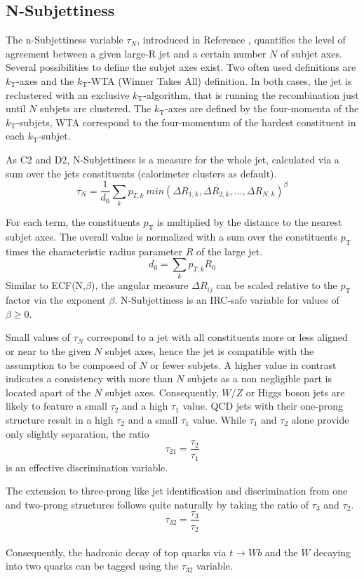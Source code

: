 
\subsection{N-Subjettiness}
The n-Subjettiness variable $\tau_N$, introduced in Reference \cite{bib:nsub}, quantifies the level of agreement between a given large-R jet and a certain number $N$ of subjet axes. Several possibilities to define the subjet axes exist. Two often used definitions are $k_\mathrm{T}$-axes and the $k_\mathrm{T}$-WTA (Winner Takes All) definition. In both cases, the jet is reclustered with an exclusive $k_\mathrm{T}$-algorithm, that is running the recombination just until $N$ subjets are clustered. The $k_\mathrm{T}$-axes are defined by the four-momenta of the $k_\mathrm{T}$-subjets, WTA correspond to the four-momentum of the hardest constituent in each $k_\mathrm{T}$-subjet.

As C2 and D2, N-Subjettiness is a measure for the whole jet, calculated via a sum over the jets constituents (calorimeter clusters as default).
\begin{equation}
\tau_N = \frac{1}{d_0}\sum_k p_{T,k}\:min(\Delta R_{1,k},\Delta R_{2,k},...,\Delta R_{N,k})^{\beta}
\end{equation}

For each term, the constituents $p_{\mathrm{T}}$ is multiplied by the distance to the nearest subjet axes. The overall value is normalized with a sum over the constituents $p_{\mathrm{T}}$ times the characteristic radius parameter $R$ of the large jet.
\begin{equation}
d_0=\sum_k p_{T,k}R_0
\end{equation}
Similar to ECF(N,$\beta$), the angular measure $\Delta R_{ij}$ can be scaled relative to the $p_{\mathrm{T}}$ factor via the exponent $\beta$. N-Subjettiness is an IRC-safe variable for values of $\beta \ge 0$.

Small values of $\tau_N$ correspond to a jet with all constituents more or less aligned or near to the given $N$ subjet axes, hence the jet is compatible with the assumption to be composed of $N$ or fewer subjets. A higher value in contrast indicates a consistency with more than $N$ subjets as a non negligible part is located apart of the $N$ subjet axes. Consequently, $W/Z$ or Higgs boson jets are likely to feature a small $\tau_2$ and a high $\tau_1$ value. QCD jets with their one-prong structure result in a high $\tau_{2}$ and a small $\tau_{1}$ value. While $\tau_1$ and $\tau_2$ alone provide only slightly separation, the ratio 
\begin{equation}
\tau_{21} = \frac{\tau_2}{\tau_1}  
\end{equation}
is an effective discrimination variable.

The extension to three-prong like jet identification and discrimination from one and two-prong structures follows quite naturally by taking the ratio of $\tau_3$ and $\tau_2$.
\begin{equation}
\tau_{32} = \frac{\tau_3}{\tau_2}  
\end{equation} \\
Consequently, the hadronic decay of top quarks via $t \rightarrow Wb$ and the $W$ decaying into two quarks can be tagged using the $\tau_{32}$ variable.
